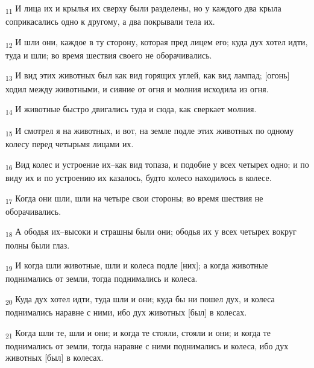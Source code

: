 \begin{tcolorbox}
\textsubscript{11} И лица их и крылья их сверху были разделены, но у каждого два крыла соприкасались одно к другому, а два покрывали тела их.
\end{tcolorbox}
\begin{tcolorbox}
\textsubscript{12} И шли они, каждое в ту сторону, которая пред лицем его; куда дух хотел идти, туда и шли; во время шествия своего не оборачивались.
\end{tcolorbox}
\begin{tcolorbox}
\textsubscript{13} И вид этих животных был как вид горящих углей, как вид лампад; [огонь] ходил между животными, и сияние от огня и молния исходила из огня.
\end{tcolorbox}
\begin{tcolorbox}
\textsubscript{14} И животные быстро двигались туда и сюда, как сверкает молния.
\end{tcolorbox}
\begin{tcolorbox}
\textsubscript{15} И смотрел я на животных, и вот, на земле подле этих животных по одному колесу перед четырьмя лицами их.
\end{tcolorbox}
\begin{tcolorbox}
\textsubscript{16} Вид колес и устроение их--как вид топаза, и подобие у всех четырех одно; и по виду их и по устроению их казалось, будто колесо находилось в колесе.
\end{tcolorbox}
\begin{tcolorbox}
\textsubscript{17} Когда они шли, шли на четыре свои стороны; во время шествия не оборачивались.
\end{tcolorbox}
\begin{tcolorbox}
\textsubscript{18} А ободья их--высоки и страшны были они; ободья их у всех четырех вокруг полны были глаз.
\end{tcolorbox}
\begin{tcolorbox}
\textsubscript{19} И когда шли животные, шли и колеса подле [них]; а когда животные поднимались от земли, тогда поднимались и колеса.
\end{tcolorbox}
\begin{tcolorbox}
\textsubscript{20} Куда дух хотел идти, туда шли и они; куда бы ни пошел дух, и колеса поднимались наравне с ними, ибо дух животных [был] в колесах.
\end{tcolorbox}
\begin{tcolorbox}
\textsubscript{21} Когда шли те, шли и они; и когда те стояли, стояли и они; и когда те поднимались от земли, тогда наравне с ними поднимались и колеса, ибо дух животных [был] в колесах.
\end{tcolorbox}
